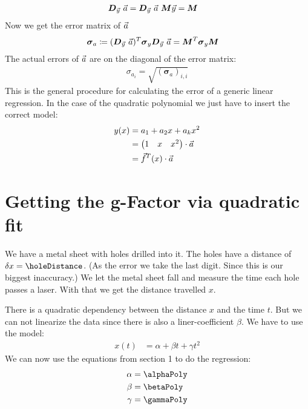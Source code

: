 \documentclass[11pt]{article}
\begin{document}
    \newcommand{\jacMatrix}{\boldsymbol{D}_{\yVec} \ \aVec}
    
    \begin{align*}
        \jacMatrix &= \jacMatrix \ \mMatrix \yVec = \mMatrix
    \end{align*}
    Now we get the error matrix of $\vec{a}$
    \newcommand{\eaMatrix}{\boldsymbol{\sigma}_{a}}
    \begin{align*}
        \eaMatrix &\coloneqq (\jacMatrix)^T \eMatrix \jacMatrix = \mMatrix^T \eMatrix \mMatrix
    \end{align*}
    The actual errors of $\vec{a}$ are on the diagonal of the error matrix:
    \begin{align*}
        \sigma_{a_i} = \sqrt {(\eaMatrix)_{i,i}}
    \end{align*}
    This is the general procedure for calculating the error of a generic linear regression. 
    In the case of the quadratic polynomial we just have to insert the correct model:
    \begin{align*}
        y(x) &= a_1 + a_2 x + a_k x^2 \\
        &= \begin{pmatrix}
               1 & x & x^2
        \end{pmatrix} \cdot \vec{a} \\
        &= \vec{f}^{T}(x) \cdot \vec{a}
    \end{align*}
    
    \section{Getting the g-Factor via quadratic fit}

    We have a metal sheet with holes drilled into it.
    The holes have a distance of $\delta x = \holeDistance$.
    (As the error we take the last digit.
    Since this is our biggest inaccuracy.)
    We let the metal sheet fall and measure the time each hole passes a laser.
    With that we get the distance travelled $x$.
    
    
    \pagebreak
    
    
    There is a quadratic dependency between the distance $x$ and the time $t$.
    But we can not linearize the data since there is also a liner-coefficient $\beta$.
    We have to use the model:
    \begin{align*}
        x(t) &= \alpha + \beta t + \gamma t^2
    \end{align*}
    We can now use the equations from section 1 to do the regression:
    \begin{align*}
        \alpha &= \alphaPoly \\
        \beta &= \betaPoly \\
        \gamma &= \gammaPoly
    \end{align*}
    
\end{document}
